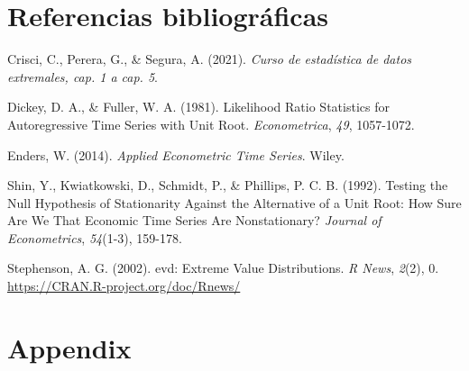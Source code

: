 \documentclass[
  12pt]{article}
\newlength{\cslhangindent}
\newenvironment{CSLReferences}[2] %
 {\begin{list}{}{%
  \setlength{\itemindent}{0pt}
  \setlength{\leftmargin}{0pt}
  \setlength{\parsep}{0pt}
  \ifodd #1
   \setlength{\leftmargin}{\cslhangindent}
   \setlength{\itemindent}{-1\cslhangindent}
  \fi
  \setlength{\itemsep}{#2\baselineskip}}}
 {\end{list}}
\begin{document}
\newpage

\section{Referencias bibliográficas}

\label{refs}
\begin{CSLReferences}{1}{0}
Crisci, C., Perera, G., \& Segura, A. (2021). \emph{Curso de estadística
de datos extremales, cap. 1 a cap. 5}.

Dickey, D. A., \& Fuller, W. A. (1981). Likelihood Ratio Statistics for
Autoregressive Time Series with Unit Root. \emph{Econometrica},
\emph{49}, 1057-1072.

Enders, W. (2014). \emph{Applied Econometric Time Series}. Wiley.

Shin, Y., Kwiatkowski, D., Schmidt, P., \& Phillips, P. C. B. (1992).
Testing the Null Hypothesis of Stationarity Against the Alternative of a
Unit Root: How Sure Are We That Economic Time Series Are Nonstationary?
\emph{Journal of Econometrics}, \emph{54}(1-3), 159-178.

Stephenson, A. G. (2002). evd: Extreme Value Distributions. \emph{R
News}, \emph{2}(2), 0. \url{https://CRAN.R-project.org/doc/Rnews/}

\end{CSLReferences}

\newpage

\section{Appendix}\label{appendix}
\end{document}
